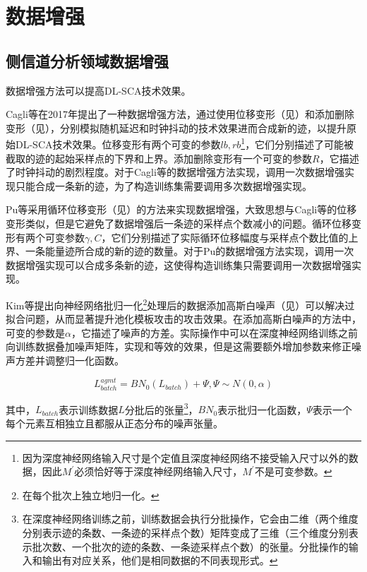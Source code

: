 {{%

	}
	\section{数据增强}\label{sec:da}
	
	\subsection{侧信道分析领域数据增强}
	数据增强方法可以提高DL-SCA技术效果。
	
	Cagli等\citep{Cagli17}在2017年提出了一种数据增强方法，通过使用位移变形（见）和添加删除变形（见），分别模拟随机延迟和时钟抖动的技术效果进而合成新的迹，以提升原始DL-SCA技术效果。位移变形有两个可变的参数$lb,rb$\footnote{因为深度神经网络输入尺寸是个定值且深度神经网络不接受输入尺寸以外的数据，因此$M^\prime$必须恰好等于深度神经网络输入尺寸，$M^\prime$不是可变参数。}，它们分别描述了可能被截取的迹的起始采样点的下界和上界。添加删除变形有一个可变的参数$R$，它描述了时钟抖动的剧烈程度。对于Cagli等的数据增强方法实现，调用一次数据增强实现只能合成一条新的迹，为了构造训练集需要调用多次数据增强实现。
	
	Pu等\citep{Pu17}采用循环位移变形（见）的方法来实现数据增强，大致思想与Cagli等\citep{Cagli17}的位移变形类似，但是它避免了数据增强后一条迹的采样点个数减小的问题。循环位移变形有两个可变参数$\gamma,C$，它们分别描述了实际循环位移幅度与采样点个数比值的上界、一条能量迹所合成的新的迹的数量。对于Pu的数据增强方法实现，调用一次数据增强实现可以合成多条新的迹，这使得构造训练集只需要调用一次数据增强实现。
	
	Kim等\citep{Kim19}提出向神经网络批归一化\footnote{在每个批次上独立地归一化。}处理后的数据添加高斯白噪声（见）可以解决过拟合问题，从而显著提升池化模板攻击的攻击效果。在添加高斯白噪声的方法中，可变的参数是$\alpha$，它描述了噪声的方差。实际操作中可以在深度神经网络训练之前向训练数据叠加噪声矩阵，实现和等效的效果，但是这需要额外增加参数来修正噪声方差并调整归一化函数。
	
	\begin{equation}\label{eq:addnoise}
		 {L_{batch}^{agmt}}=BN_0(L_{batch})+\Psi,\Psi\sim N(0,\alpha)
	\end{equation}
	
	\noindent 其中，$L_{batch}$表示训练数据$L$分批后的张量\footnote{在深度神经网络训练之前，训练数据会执行分批操作，它会由二维（两个维度分别表示迹的条数、一条迹的采样点个数）矩阵变成了三维（三个维度分别表示批次数、一个批次的迹的条数、一条迹采样点个数）的张量。分批操作的输入和输出有对应关系，他们是相同数据的不同表现形式。}，$BN_0$表示批归一化函数，$\Psi$表示一个每个元素互相独立且都服从正态分布的噪声张量。
	
}
